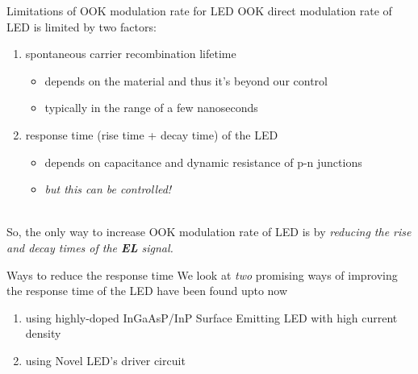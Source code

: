 \documentclass[mathserif]{beamer}
\begin{document}
    \begin{frame}{Limitations of OOK modulation rate for LED}
        \pause
        OOK direct modulation rate of LED is limited by two factors:
        
        \begin{enumerate}
            
            \pause \item spontaneous carrier recombination lifetime
            \begin{itemize}
                \pause \item depends on the material and thus it's beyond our control
                \pause \item typically in the range of a few nanoseconds
            \end{itemize}
            
            \pause \item response time (rise time + decay time) of the LED  
            \begin{itemize}
                \pause \item depends on capacitance and dynamic resistance of p-n junctions
                \pause \item \emph{but this can be controlled!} \\~\\
            \end{itemize}
            
        \end{enumerate}
        
        \pause
        So, the only way to increase OOK modulation rate of LED is by \emph{reducing the rise and decay times of the \textbf{EL} signal.}       
    \end{frame}


   
    \begin{frame}{Ways to reduce the response time}
        \pause
        We look at \emph{two} promising ways of improving the response time of the LED have been found upto now
        \begin{enumerate}
            \pause \item using highly-doped InGaAsP/InP Surface Emitting LED with high current density
            \pause \item using Novel LED's driver circuit \\~\\
        \end{enumerate}
     \end{frame}
    
\end{document}
